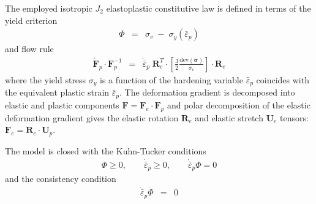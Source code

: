 \documentclass[sn-mathphys,Numbered,draft]{sn-jnl}%
\newcommand{\bb}{\boldsymbol}
\begin{document}
The employed isotropic $J_2$ elastoplastic constitutive law is defined in terms of the yield criterion
\begin{eqnarray} \label{eq:yieldFunc}
	\Phi &=& \sigma_v \; - \; \sigma_y\left(\bar{\varepsilon}_p \right)
\end{eqnarray}
and flow rule
\begin{eqnarray} \label{eq:flowRule}
    \dot{\mathbf{F}}_p \cdot \mathbf{F}_p^{-1}
    &=&
    \dot{\bar{\varepsilon}}_p \; \mathbf{R}_e^T \cdot 
    \left[
    \frac{3}{2} \frac{\text{dev}\left(\boldsymbol{\sigma} \right)} {\sigma_{v}}
    \right]
    \cdot  \mathbf{R}_e
\end{eqnarray}
where the yield stress $\sigma_y$ is a function of the hardening variable $\bar{\varepsilon}_p$ coincides with the equivalent plastic strain $\bar{\varepsilon}_p$.
The deformation gradient is decomposed into elastic and plastic components $\bb{F} = \bb{F}_e \cdot \bb{F}_p$ and polar decomposition of the elastic deformation gradient gives the elastic rotation $\bb{R}_e$ and elastic stretch $\bb{U}_e$ tensors: $\bb{F}_e = \bb{R}_e \cdot \bb{U}_p$.

The model is closed with the Kuhn-Tucker conditions
\begin{eqnarray}
	\Phi \geq 0, \quad\quad
	\dot{\bar{\varepsilon}}_p \geq 0, \quad\quad
	\dot{\bar{\varepsilon}}_p \Phi = 0
\end{eqnarray}
and the consistency condition
\begin{eqnarray}
	\dot{\bar{\varepsilon}}_p \dot{\Phi} &=& 0
\end{eqnarray}
\end{document}
